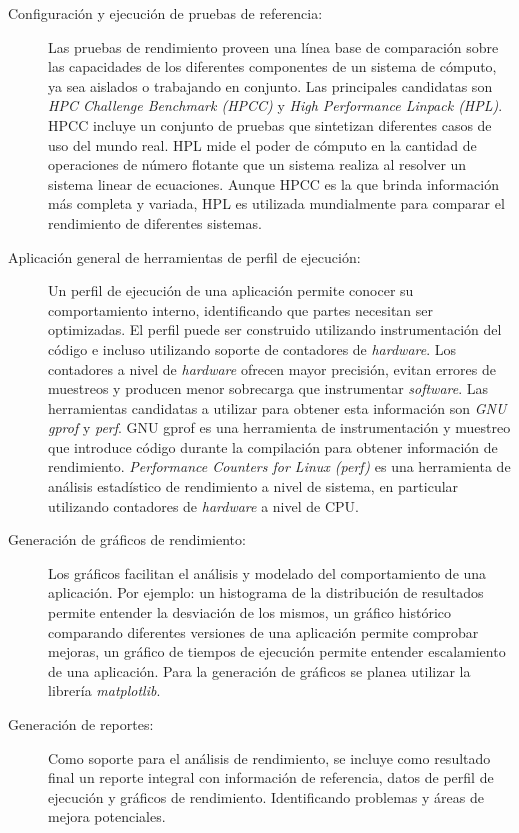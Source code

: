 \documentclass[a4paper]{article}
\begin{document}
\begin{description}
\item[Configuración y ejecución de pruebas de referencia:]

Las pruebas de rendimiento proveen una línea base de comparación sobre las capacidades de los diferentes componentes de un sistema de cómputo, ya sea aislados o trabajando en conjunto. Las principales candidatas son {\it HPC Challenge Benchmark (HPCC)} y {\it High Performance Linpack (HPL)}. HPCC incluye un conjunto de pruebas que sintetizan diferentes casos de uso del mundo real.  HPL mide el poder de cómputo en la cantidad de operaciones de número flotante que un sistema realiza al resolver un sistema linear de ecuaciones. Aunque HPCC es la que brinda información más completa y variada, HPL es utilizada mundialmente para comparar el rendimiento de diferentes sistemas.

\item[Aplicación general de herramientas de perfil de ejecución:]

Un perfil de ejecución de una aplicación permite conocer su comportamiento interno, identificando que partes necesitan ser optimizadas. El perfil puede ser construido utilizando instrumentación del código e incluso utilizando soporte de contadores de {\it hardware}. Los contadores a nivel de {\it hardware} ofrecen mayor precisión, evitan errores de muestreos y producen menor sobrecarga que instrumentar {\it software}.
Las herramientas candidatas a utilizar para obtener esta información son {\it GNU gprof} y {\it perf}. GNU gprof es una herramienta de instrumentación y muestreo que introduce código durante la compilación para obtener información de rendimiento. {\it Performance Counters for Linux (perf)} es una herramienta de análisis estadístico de rendimiento a nivel de sistema, en particular utilizando contadores de {\it hardware} a nivel de CPU.

\item[Generación de gráficos de rendimiento:]

Los gráficos facilitan el análisis y modelado del comportamiento de una aplicación. Por ejemplo: un histograma de la distribución de resultados permite entender la desviación de los mismos, un gráfico histórico comparando diferentes versiones de una aplicación permite comprobar mejoras, un gráfico de tiempos de ejecución permite entender escalamiento de una aplicación. Para la generación de gráficos se planea utilizar la librería {\it matplotlib}.

\item[Generación de reportes:]

Como soporte para el análisis de rendimiento, se incluye como resultado final un reporte integral con información de referencia, datos de perfil de ejecución y gráficos de rendimiento. Identificando problemas y áreas de mejora potenciales. 

\end{description}
\end{document}
